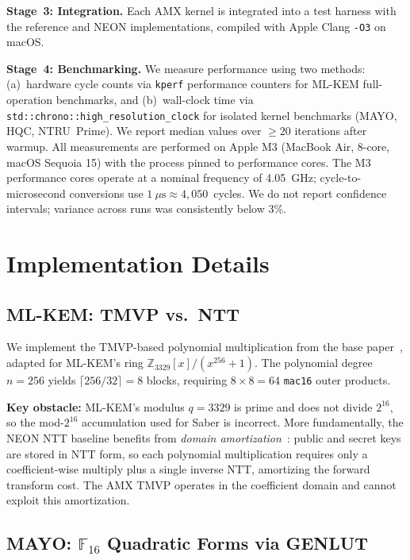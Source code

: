 \documentclass[utf8]{FrontiersinHarvard}
\begin{document}
\textbf{Stage~3: Integration.} Each AMX kernel is integrated into a test harness with the reference and NEON implementations, compiled with Apple Clang \texttt{-O3} on macOS.

\textbf{Stage~4: Benchmarking.} We measure performance using two methods: (a)~hardware cycle counts via \texttt{kperf} performance counters for ML-KEM full-operation benchmarks, and (b)~wall-clock time via \texttt{std::chrono::high\_resolution\_clock} for isolated kernel benchmarks (MAYO, HQC, NTRU~Prime). We report median values over $\geq 20$ iterations after warmup. All measurements are performed on Apple M3 (MacBook Air, 8-core, macOS Sequoia 15) with the process pinned to performance cores. The M3 performance cores operate at a nominal frequency of 4.05~GHz; cycle-to-microsecond conversions use $1~\mu\text{s} \approx 4{,}050$~cycles. We do not report confidence intervals; variance across runs was consistently below 3\%.


\section{Implementation Details}
\label{sec:implementation}

\subsection{ML-KEM: TMVP vs.\ NTT}

We implement the TMVP-based polynomial multiplication from the base paper~\cite{gazzoni2024pqcamx}, adapted for ML-KEM's ring $\mathbb{Z}_{3329}[x]/(x^{256}+1)$. The polynomial degree $n = 256$ yields $\lceil 256/32 \rceil = 8$ blocks, requiring $8 \times 8 = 64$ \texttt{mac16} outer products.

\textbf{Key obstacle:} ML-KEM's modulus $q = 3329$ is prime and does not divide $2^{16}$, so the mod-$2^{16}$ accumulation used for Saber is incorrect. More fundamentally, the NEON NTT baseline benefits from \emph{domain amortization}~\cite{longa2016speeding}: public and secret keys are stored in NTT form, so each polynomial multiplication requires only a coefficient-wise multiply plus a single inverse NTT, amortizing the forward transform cost. The AMX TMVP operates in the coefficient domain and cannot exploit this amortization.

\subsection{MAYO: $\mathbb{F}_{16}$ Quadratic Forms via GENLUT}
\end{document}
